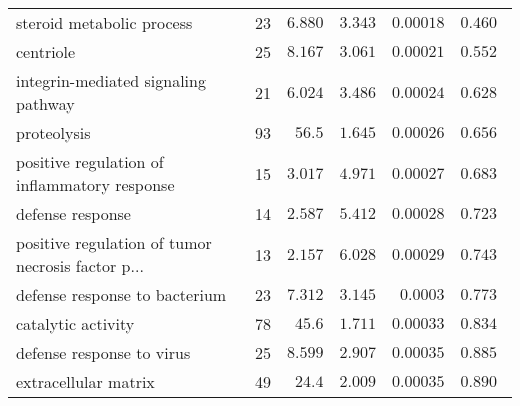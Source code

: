 \begin{longtable}{|l|r|r|r|r|r|}
                         steroid metabolic process &                      23 &                $ 6.880$ &   $ 3.343$ &            $0.00018$ &                    $ 0.460~~$ \\
                                         centriole &                      25 &                $ 8.167$ &   $ 3.061$ &            $0.00021$ &                    $ 0.552~~$ \\
               integrin-mediated signaling pathway &                      21 &                $ 6.024$ &   $ 3.486$ &            $0.00024$ &                    $ 0.628~~$ \\
                                       proteolysis &                      93 &                $  56.5$ &   $ 1.645$ &            $0.00026$ &                    $ 0.656~~$ \\
      positive regulation of inflammatory response &                      15 &                $ 3.017$ &   $ 4.971$ &            $0.00027$ &                    $ 0.683~~$ \\
                                  defense response &                      14 &                $ 2.587$ &   $ 5.412$ &            $0.00028$ &                    $ 0.723~~$ \\
 positive regulation of tumor necrosis factor p... &                      13 &                $ 2.157$ &   $ 6.028$ &            $0.00029$ &                    $ 0.743~~$ \\
                     defense response to bacterium &                      23 &                $ 7.312$ &   $ 3.145$ &             $0.0003$ &                    $ 0.773~~$ \\
                                catalytic activity &                      78 &                $  45.6$ &   $ 1.711$ &            $0.00033$ &                    $ 0.834~~$ \\
                         defense response to virus &                      25 &                $ 8.599$ &   $ 2.907$ &            $0.00035$ &                    $ 0.885~~$ \\
                              extracellular matrix &                      49 &                $  24.4$ &   $ 2.009$ &            $0.00035$ &                    $ 0.890~~$ \\
\end{longtable}
